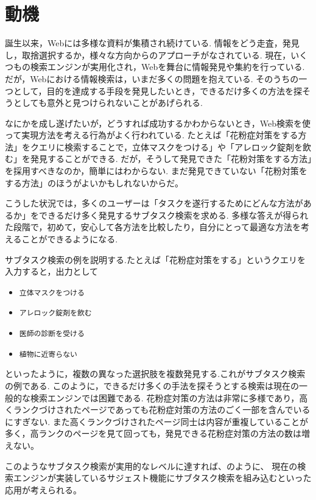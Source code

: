 \documentclass[submit,techreq]{ipsj}
\def\|{\verb|}
\begin{document}
%1
\section{動機}

誕生以来，Webには多様な資料が集積され続けている. 情報をどう走査，発見し，取捨選択するか，様々な方向からのアプローチがなされている. 
現在，いくつもの検索エンジンが実用化され，Webを舞台に情報発見や集約を行っている. だが，Webにおける情報検索は，いまだ多くの問題を抱えている. 
そのうちの一つとして，目的を達成する手段を発見したいとき，できるだけ多くの方法を探そうとしても意外と見つけられないことがあげられる.


なにかを成し遂げたいが，どうすれば成功するかわからないとき，Web検索を使って実現方法を考える行為がよく行われている. たとえば「花粉症対策をする方法」をクエリに検索することで，立体マスクをつける」や「アレロック錠剤を飲む」を発見することができる. だが，そうして発見できた「花粉対策をする方法」を採用すべきなのか，簡単にはわからない. まだ発見できていない「花粉対策をする方法」のほうがよいかもしれないからだ。


こうした状況では，多くのユーザーは「タスクを遂行するためにどんな方法があるか」をできるだけ多く発見するサブタスク検索を求める. 多様な答えが得られた段階で，初めて，安心して各方法を比較したり，自分にとって最適な方法を考えることができるようになる.

サブタスク検索の例を説明する.たとえば「花粉症対策をする」というクエリを入力すると，出力として


\begin{itemize}
\item \|立体マスクをつける|
\item \|アレロック錠剤を飲む|
\item \|医師の診断を受ける|
\item \|植物に近寄らない|
\end{itemize}


といったように，複数の異なった選択肢を複数発見する.これがサブタスク検索の例である. このように，できるだけ多くの手法を探そうとする検索は現在の一般的な検索エンジンでは困難である. 花粉症対策の方法は非常に多様であり，高くランクづけされたページであっても花粉症対策の方法のごく一部を含んでいるにすぎない. また高くランクづけされたページ同士は内容が重複していることが多く，高ランクのページを見て回っても，発見できる花粉症対策の方法の数は増えない。

このようなサブタスク検索が実用的なレベルに達すれば、のように、 現在の検索エンジンが実装しているサジェスト機能にサブタスク検索を組み込むといった応用が考えられる。
\end{document}
